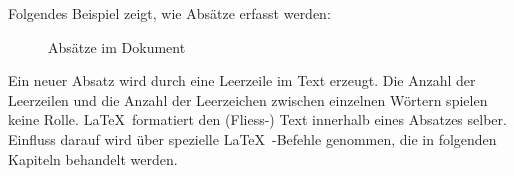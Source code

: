 
Folgendes Beispiel zeigt, wie Absätze erfasst werden:

\begin{figure}[h!]
    \centering
      \caption{Absätze im Dokument}
    \label{fig:GliederungAbsatz}
\end{figure} 

Ein neuer Absatz wird durch eine Leerzeile im Text erzeugt. Die Anzahl der Leerzeilen und die Anzahl der Leerzeichen zwischen einzelnen Wörtern spielen keine Rolle. \LaTeX\ formatiert den (Fliess-) Text innerhalb eines Absatzes selber. Einfluss darauf wird über spezielle \LaTeX\ -Befehle genommen, die in folgenden Kapiteln behandelt werden.
 